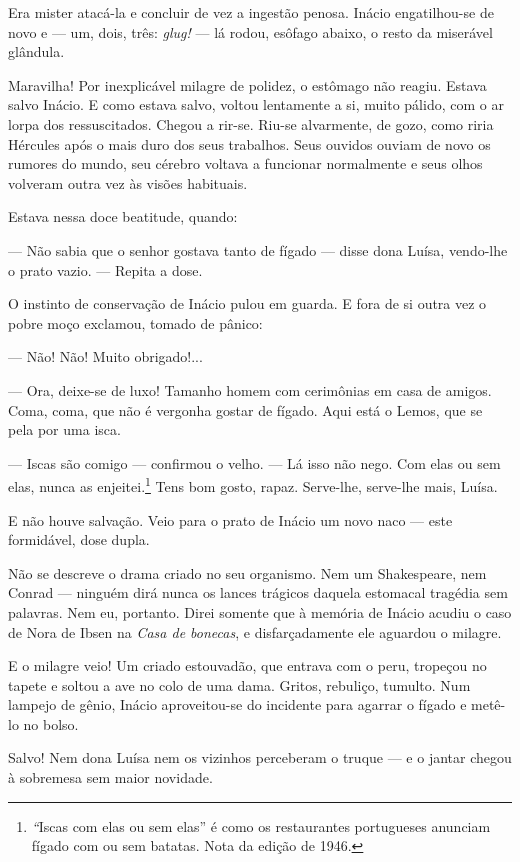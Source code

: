 Era mister atacá-la e concluir de vez a ingestão penosa. Inácio
engatilhou-se de novo e --- um, dois, três: \emph{glug!} --- lá rodou,
esôfago abaixo, o resto da miserável glândula.

Maravilha! Por inexplicável milagre de polidez, o estômago não reagiu.
Estava salvo Inácio. E como estava salvo, voltou lentamente a si, muito
pálido, com o ar lorpa dos ressuscitados. Chegou a rir-se. Riu-se
alvarmente, de gozo, como riria Hércules após o mais duro dos seus
trabalhos. Seus ouvidos ouviam de novo os rumores do mundo, seu cérebro
voltava a funcionar normalmente e seus olhos volveram outra vez às
visões habituais.

Estava nessa doce beatitude, quando:

--- Não sabia que o senhor gostava tanto de fígado --- disse dona Luísa,
vendo-lhe o prato vazio. --- Repita a dose.

O instinto de conservação de Inácio pulou em guarda. E fora de si outra
vez o pobre moço exclamou, tomado de pânico:

--- Não! Não! Muito obrigado!...

--- Ora, deixe-se de luxo! Tamanho homem com cerimônias em casa de
amigos. Coma, coma, que não é vergonha gostar de fígado. Aqui está o
Lemos, que se pela por uma isca.

--- Iscas são comigo --- confirmou o velho. --- Lá isso não nego. Com
elas ou sem elas, nunca as enjeitei.\footnote{\emph{``}Iscas com elas ou
  sem elas'' é como os restaurantes portugueses anunciam fígado com ou
  sem batatas. Nota da edição de 1946.} Tens bom gosto, rapaz.
Serve-lhe, serve-lhe mais, Luísa.

E não houve salvação. Veio para o prato de Inácio um novo naco --- este
formidável, dose dupla.

Não se descreve o drama criado no seu organismo. Nem um Shakespeare, nem
Conrad --- ninguém dirá nunca os lances trágicos daquela estomacal
tragédia sem palavras. Nem eu, portanto. Direi somente que à memória de
Inácio acudiu o caso de Nora de Ibsen na \emph{Casa de bonecas}, e
disfarçadamente ele aguardou o milagre.

E o milagre veio! Um criado estouvadão, que entrava com o peru, tropeçou
no tapete e soltou a ave no colo de uma dama. Gritos, rebuliço, tumulto.
Num lampejo de gênio, Inácio aproveitou-se do incidente para agarrar o
fígado e metê-lo no bolso.

Salvo! Nem dona Luísa nem os vizinhos perceberam o truque --- e o jantar
chegou à sobremesa sem maior novidade.

